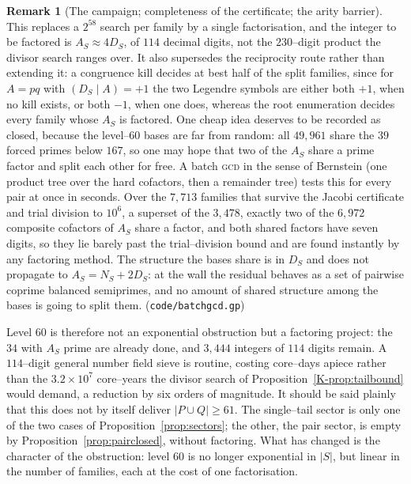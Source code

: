 \documentclass[11pt]{article}
\theoremstyle{definition}
\newtheorem{remark}[theorem]{Remark}
\begin{document}
\begin{remark}[The campaign; completeness of the certificate; the arity barrier]
This replaces a $2^{58}$ search per family by a single factorisation, and the integer to be factored is
$A_S\approx4D_S$, of $114$ decimal digits, not the $230$--digit product the divisor search ranges over.
It also supersedes the reciprocity route rather than extending it: a congruence kill decides at best
half of the split families, since for $A=pq$ with $(D_S\mid A)=+1$ the two Legendre symbols are either
both $+1$, when no kill exists, or both $-1$, when one does, whereas the root enumeration decides every
family whose $A_S$ is factored. One cheap idea deserves to be recorded as closed, because the level--$60$ bases are far from random:
all $49{,}961$ share the $39$ forced primes below $167$, so one may hope that two of the $A_S$ share a
prime factor and split each other for free. A batch \textsc{gcd} in the sense of Bernstein (one
product tree over the hard cofactors, then a remainder tree) tests this for every pair at once in
seconds. Over the $7{,}713$ families that survive the Jacobi certificate and trial division to $10^6$,
a superset of the $3{,}478$, exactly two of the $6{,}972$ composite cofactors of $A_S$ share a factor,
and both shared factors have seven digits, so they lie barely past the trial--division bound and are
found instantly by any factoring method. The structure the bases share is in $D_S$ and does not
propagate to $A_S=N_S+2D_S$: at the wall the residual behaves as a set of pairwise coprime balanced
semiprimes, and no amount of shared structure among the bases is going to split them.
\textup{(\texttt{code/batchgcd.gp})}

Level $60$ is therefore not an exponential obstruction but a factoring
project: the $34$ with $A_S$ prime are already done, and $3{,}444$ integers of $114$ digits remain.
A $114$--digit general number field sieve is routine, costing core--days apiece rather than the
$3.2\times10^7$ core--years the divisor search of Proposition~\ref{K-prop:tailbound} would demand, a
reduction by six orders of magnitude. It should be said plainly that this does not by itself deliver
$|P\cup Q|\ge61$. The single--tail sector is only one of the two cases of
Proposition~\ref{prop:sectors}; the other, the pair sector, is empty by Proposition~\ref{prop:pairclosed}, without
factoring. What has changed is the character of the obstruction: level $60$ is no
longer exponential in $|S|$, but linear in the number of families, each at the cost of one
factorisation.


\end{remark}
\end{document}
